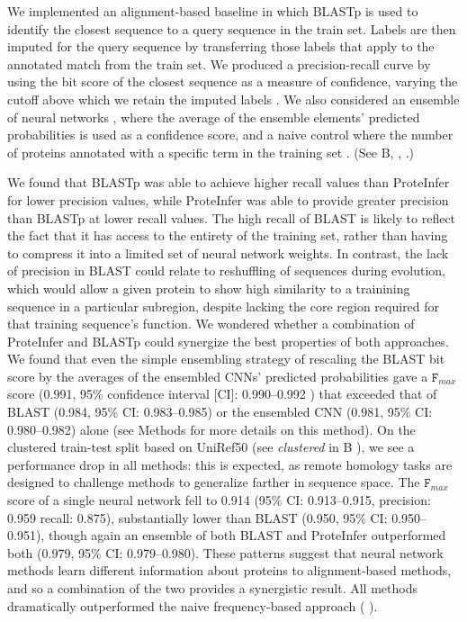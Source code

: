 We implemented an alignment-based baseline in which BLASTp is used to identify the closest sequence to a query sequence in the train set. Labels are then imputed for the query sequence by transferring those labels that apply to the annotated match from the train set. We produced a precision-recall curve by using the bit score of the closest sequence as a measure of confidence, varying the cutoff above which we retain the imputed labels \cite{zhou2019cafa, eddy2011accelerated}. We also considered an ensemble of neural networks \cite{bileschi}, where the average of the ensemble elements' predicted probabilities is used as a confidence score, and a naive control where the number of proteins annotated with a specific term in the training set \citep{radivojac2013large}. %
(See B, , .)

We found that BLASTp was able to achieve higher recall values than ProteInfer for lower precision values, while ProteInfer was able to provide greater precision than BLASTp at lower recall values. The high recall of BLAST is likely to reflect the fact that it has access to the entirety of the training set, rather than having to compress it into a limited set of neural network weights. In contrast, the lack of precision in BLAST could relate to reshuffling of sequences during evolution, which would allow a given protein to show high similarity to a trainining sequence in a particular subregion, despite lacking the core region required for that training sequence's function.  We wondered whether a combination of ProteInfer and BLASTp could synergize the best properties of both approaches. We found that even the simple ensembling strategy of rescaling the BLAST bit score by the averages of the ensembled CNNs' predicted probabilities gave a $\texttt{F}_{max}$ score (0.991, 95\% confidence interval [CI]: 0.990--0.992 ) that exceeded that of BLAST (0.984, 95\% CI: 0.983--0.985) or the ensembled CNN (0.981, 95\% CI: 0.980--0.982) alone (see Methods for more details on this method). 
On the clustered train-test split based on UniRef50 (see \textit{clustered} in B%
), we see a performance drop in all methods: this is expected, as remote homology tasks are designed to challenge methods to generalize farther in sequence space. The $\texttt{F}_{max}$ score of a single neural network fell to 0.914 (95\% CI: 0.913--0.915, precision: 0.959 recall: 0.875), substantially lower than BLAST (0.950, 95\% CI: 0.950--0.951), though again an ensemble of both BLAST and ProteInfer outperformed both (0.979, 95\% CI: 0.979--0.980). These patterns suggest that neural network methods learn different information about proteins to alignment-based methods, and so a combination of the two provides a synergistic result. All methods dramatically outperformed the naive frequency-based approach (%
).


